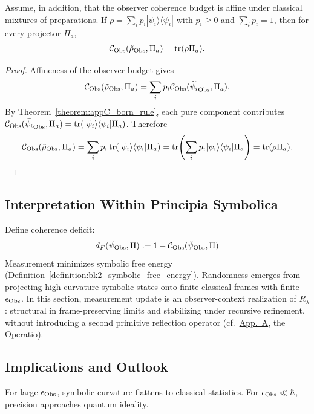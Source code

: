 \begin{corollary}
\label{corollary:appC_mixed_states}
Assume, in addition, that the observer coherence budget is affine under classical
mixtures of preparations. If
$\rho = \sum_i p_i |\psi_i\rangle\langle\psi_i|$ with $p_i\ge0$ and
$\sum_i p_i=1$, then for every projector $\Pi_a$,
\[
\mathcal{C}_{\mathrm{Obs}}(\tilde\rho_{\mathrm{Obs}}, \Pi_a) = \operatorname{tr}(\rho \Pi_a).
\]
\end{corollary}

\begin{proof}
\label{proof:appC_mixed_states}
Affineness of the observer budget gives
\[
\mathcal{C}_{\mathrm{Obs}}(\tilde\rho_{\mathrm{Obs}},\Pi_a)
=\sum_i p_i\mathcal{C}_{\mathrm{Obs}}(\widetilde{\psi_i}_{\mathrm{Obs}},\Pi_a).
\]
By Theorem~\ref{theorem:appC_born_rule}, each pure component contributes
$\mathcal{C}_{\mathrm{Obs}}(\widetilde{\psi_i}_{\mathrm{Obs}},\Pi_a)
=\operatorname{tr}(|\psi_i\rangle\langle\psi_i|\Pi_a)$. Therefore
\[
\mathcal{C}_{\mathrm{Obs}}(\tilde\rho_{\mathrm{Obs}},\Pi_a)
=\sum_i p_i\operatorname{tr}(|\psi_i\rangle\langle\psi_i|\Pi_a)
=\operatorname{tr}\!\left(\sum_i p_i|\psi_i\rangle\langle\psi_i|\Pi_a\right)
=\operatorname{tr}(\rho\Pi_a).
\]
\end{proof}

\subsection{Interpretation Within Principia Symbolica}
\label{subsec:appC_born_interpretation_ps}
Define coherence deficit:
\[
d_F(\tilde\psi_{\mathrm{Obs}}, \Pi) := 1 - \mathcal{C}_{\mathrm{Obs}}(\tilde\psi_{\mathrm{Obs}}, \Pi)
\]
Measurement minimizes symbolic free energy (Definition~\ref{definition:bk2_symbolic_free_energy}).
Randomness emerges from projecting high-curvature symbolic states
onto finite classical frames with finite $\epsilon_{\mathrm{Obs}}$.
In this section, measurement update is an observer-context realization of \(R_\lambda\): structural in frame-preserving limits and stabilizing under recursive refinement, without introducing a second primitive reflection operator (cf.~\hyperref[dict:appA_symbolic_reflection_operator]{App.~A}, the \hyperref[sec:bk1_operatio]{Operatio}).

\subsection{Implications and Outlook}
\label{subsec:appC_born_outlook}
For large $\epsilon_{\mathrm{Obs}}$, symbolic curvature flattens to classical statistics.
For $\epsilon_{\mathrm{Obs}} \ll \hbar$, precision approaches quantum ideality.

